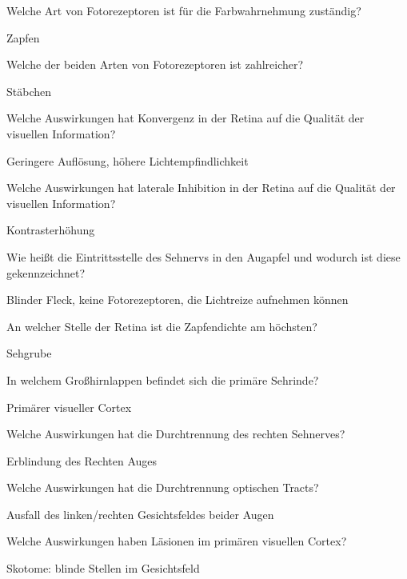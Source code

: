 \documentclass[10pt, a4paper]{exam}
\begin{document}
\begin{questions}
  \question Welche Art von Fotorezeptoren ist für die Farbwahrnehmung zuständig?
  \begin{solution}
    Zapfen
  \end{solution}

  \question Welche der beiden Arten von Fotorezeptoren ist zahlreicher?
  \begin{solution}
    Stäbchen
  \end{solution}

  \question Welche Auswirkungen hat Konvergenz in der Retina auf die Qualität der visuellen Information?
  \begin{solution}
    Geringere Auflösung, höhere Lichtempfindlichkeit
  \end{solution}

  \question Welche Auswirkungen hat laterale Inhibition in der Retina auf die Qualität der visuellen Information?
  \begin{solution}
    Kontrasterhöhung
  \end{solution}

  \question Wie heißt die Eintrittsstelle des Sehnervs in den Augapfel und wodurch ist diese gekennzeichnet?
  \begin{solution}
    Blinder Fleck, keine Fotorezeptoren, die Lichtreize aufnehmen können
  \end{solution}

  \question An welcher Stelle der Retina ist die Zapfendichte am höchsten?
  \begin{solution}
    Sehgrube
  \end{solution}

  \question In welchem Großhirnlappen befindet sich die primäre Sehrinde?
  \begin{solution}
    Primärer visueller Cortex
  \end{solution}

  \question Welche Auswirkungen hat die Durchtrennung des rechten Sehnerves?
  \begin{solution}
    Erblindung des Rechten Auges
  \end{solution}

  \question Welche Auswirkungen hat die Durchtrennung optischen Tracts?
  \begin{solution}
    Ausfall des linken/rechten Gesichtsfeldes beider Augen
  \end{solution}

  \question Welche Auswirkungen haben Läsionen im primären visuellen Cortex?
  \begin{solution}
    Skotome: blinde Stellen im Gesichtsfeld
  \end{solution}


\end{questions}
\end{document}
